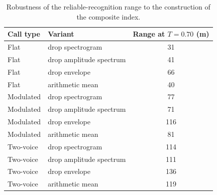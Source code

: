 \begin{table}[H]
\centering
\caption{Robustness of the reliable-recognition range to the construction of the composite index.}
\label{tab:p2robust}
\small
\begin{tabular}{llc}
\toprule
Call type & Variant & Range at $T=0.70$ (m) \\
\midrule
Flat & drop spectrogram & 31 \\
Flat & drop amplitude spectrum & 41 \\
Flat & drop envelope & 66 \\
Flat & arithmetic mean & 40 \\
Modulated & drop spectrogram & 77 \\
Modulated & drop amplitude spectrum & 71 \\
Modulated & drop envelope & 116 \\
Modulated & arithmetic mean & 81 \\
Two-voice & drop spectrogram & 114 \\
Two-voice & drop amplitude spectrum & 111 \\
Two-voice & drop envelope & 136 \\
Two-voice & arithmetic mean & 119 \\
\bottomrule
\end{tabular}
\end{table}